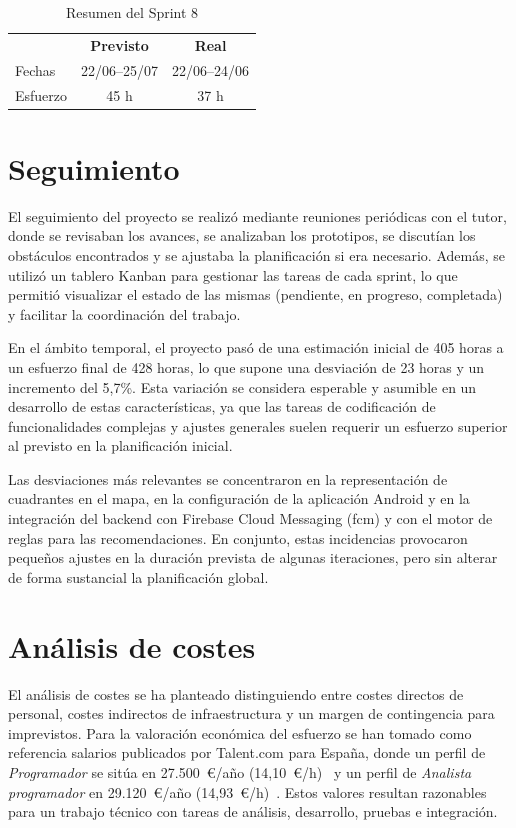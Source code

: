 \begin{table}[H]
  \centering
  \begin{tabular}{l|c|c}
    \rowcolor{udcpink!25}
    \textbf{} & \textbf{Previsto} & \textbf{Real} \\
    Fechas & 22/06--25/07 & 22/06--24/06 \\
    Esfuerzo & 45 h & 37 h \\
  \end{tabular}
  \caption{Resumen del Sprint 8}
  \label{tab:sprint8}
\end{table}

\section{Seguimiento}
\label{sec:seguimiento}

El seguimiento del proyecto se realizó mediante reuniones periódicas con el tutor, donde se revisaban los avances, se analizaban los prototipos, se discutían los obstáculos encontrados y se ajustaba la planificación si era necesario. Además, se utilizó un tablero Kanban \cite{kanban} para gestionar las tareas de cada sprint, lo que permitió visualizar el estado de las mismas (pendiente, en progreso, completada) y facilitar la coordinación del trabajo.

En el ámbito temporal, el proyecto pasó de una estimación inicial de 405 horas a un esfuerzo final de 428 horas, lo que supone una desviación de 23 horas y un incremento del 5,7\%. Esta variación se considera esperable y asumible en un desarrollo de estas características, ya que las tareas de codificación de funcionalidades complejas y ajustes generales suelen requerir un esfuerzo superior al previsto en la planificación inicial.

Las desviaciones más relevantes se concentraron en la representación de cuadrantes en el mapa, en la configuración de la aplicación Android y en la integración del backend con Firebase Cloud Messaging (\acrshort{fcm}) y con el motor de reglas para las recomendaciones. En conjunto, estas incidencias provocaron pequeños ajustes en la duración prevista de algunas iteraciones, pero sin alterar de forma sustancial la planificación global. 

\section{Análisis de costes}
\label{sec:costes}

El análisis de costes se ha planteado distinguiendo entre costes directos de personal, costes indirectos de infraestructura y un margen de contingencia para imprevistos. Para la valoración económica del esfuerzo se han tomado como referencia salarios publicados por Talent.com para España, donde un perfil de \textit{Programador} se sitúa en 27.500~\euro/año (14,10~\euro/h)~\cite{salario_programador} y un perfil de \textit{Analista programador} en 29.120~\euro/año (14,93~\euro/h)~\cite{salario_analista_programador}. Estos valores resultan razonables para un trabajo técnico con tareas de análisis, desarrollo, pruebas e integración.


